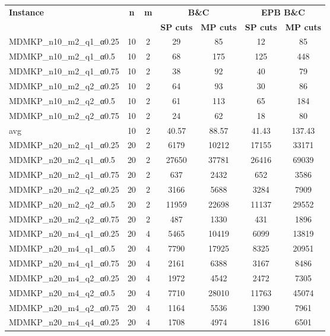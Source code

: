 \begin{table}[!ht]
\centering
\hspace*{-1cm}\begin{tabular}{lcccccc}
\toprule
\textbf{Instance} & \textbf{n} & \textbf{m} & \multicolumn{2}{c}{\textbf{B\&C}}  & \multicolumn{2}{c}{\textbf{EPB B\&C}}
\\
\cmidrule(r){4-5} \cmidrule(r){6-7} 
~ & ~ & ~ & \textbf{SP cuts} &\textbf{MP cuts} & \textbf{SP cuts} &\textbf{MP cuts} \\
\midrule

MDMKP\_n10\_m2\_q1\_α0.25 & 10 & 2 & 29 & 85 & 12 & 85 \\
MDMKP\_n10\_m2\_q1\_α0.5 & 10 & 2 & 68 & 175 & 125 & 448 \\
MDMKP\_n10\_m2\_q1\_α0.75 & 10 & 2 & 38 & 92 & 40 & 79 \\
MDMKP\_n10\_m2\_q2\_α0.25 & 10 & 2 & 64 & 93 & 30 & 86 \\
MDMKP\_n10\_m2\_q2\_α0.5 & 10 & 2 & 61 & 113 & 65 & 184 \\
MDMKP\_n10\_m2\_q2\_α0.75 & 10 & 2 & 24 & 62 & 18 & 80 \\
\cline{1-9} avg & 10 & 2 & 40.57& 88.57 & 41.43& 137.43\\ \hline
MDMKP\_n20\_m2\_q1\_α0.25 & 20 & 2 & 6179 & 10212 & 17155 & 33171 \\
MDMKP\_n20\_m2\_q1\_α0.5 & 20 & 2 & 27650 & 37781 & 26416 & 69039 \\
MDMKP\_n20\_m2\_q1\_α0.75 & 20 & 2 & 637 & 2432 & 652 & 3586 \\
MDMKP\_n20\_m2\_q2\_α0.25 & 20 & 2 & 3166 & 5688 & 3284 & 7909 \\
MDMKP\_n20\_m2\_q2\_α0.5 & 20 & 2 & 11959 & 22698 & 11137 & 29552 \\
MDMKP\_n20\_m2\_q2\_α0.75 & 20 & 2 & 487 & 1330 & 431 & 1896 \\
MDMKP\_n20\_m4\_q1\_α0.25 & 20 & 4 & 5465 & 10419 & 6099 & 13819 \\
MDMKP\_n20\_m4\_q1\_α0.5 & 20 & 4 & 7790 & 17925 & 8325 & 20951 \\
MDMKP\_n20\_m4\_q1\_α0.75 & 20 & 4 & 2161 & 6388 & 3167 & 8486 \\
MDMKP\_n20\_m4\_q2\_α0.25 & 20 & 4 & 1972 & 4542 & 2472 & 7305 \\
MDMKP\_n20\_m4\_q2\_α0.5 & 20 & 4 & 7710 & 28010 & 11763 & 45074 \\
MDMKP\_n20\_m4\_q2\_α0.75 & 20 & 4 & 1164 & 5536 & 1390 & 7961 \\
MDMKP\_n20\_m4\_q4\_α0.25 & 20 & 4 & 1708 & 4974 & 1816 & 6501 \\

\end{tabular}
\end{table}
